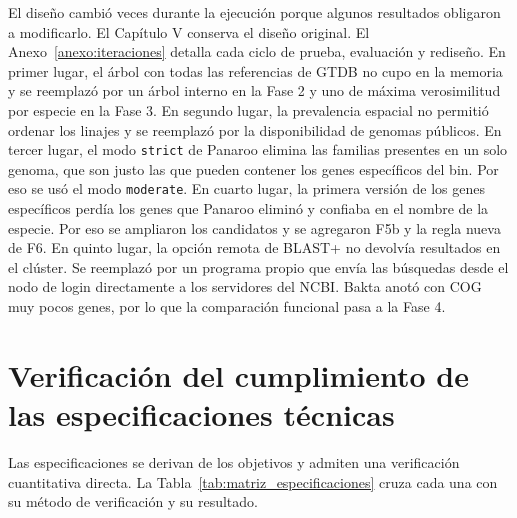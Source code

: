 El diseño cambió  veces durante la ejecución porque algunos resultados
obligaron a modificarlo. El Capítulo V conserva el diseño original. El
Anexo~\ref{anexo:iteraciones} detalla cada ciclo de prueba, evaluación y
rediseño. En primer lugar, el árbol con todas las referencias de GTDB no cupo en
la memoria y se reemplazó por un árbol interno en la Fase 2 y uno de máxima
verosimilitud por especie en la Fase 3. En segundo lugar, la prevalencia
espacial no permitió ordenar los linajes y se reemplazó por la disponibilidad de
genomas públicos. En tercer lugar, el modo \texttt{strict} de Panaroo elimina las familias
presentes en un solo genoma, que son justo las que pueden contener los genes
específicos del bin. Por eso se usó el modo \texttt{moderate}. En cuarto lugar, la
primera versión de los genes específicos perdía los genes que Panaroo eliminó y
confiaba en el nombre de la especie. Por eso se ampliaron los candidatos y se
agregaron F5b y la regla nueva de F6. En quinto lugar, la opción remota de BLAST+ no devolvía resultados en el
clúster. Se reemplazó por un programa propio que envía las búsquedas desde el
nodo de login directamente a los servidores del NCBI.  Bakta
anotó con COG muy pocos genes, por lo que la comparación funcional pasa a la
Fase 4. 


\section{Verificación del cumplimiento de las especificaciones técnicas}

Las especificaciones se derivan de los objetivos  y admiten una
verificación cuantitativa directa. La Tabla~\ref{tab:matriz_especificaciones}
cruza cada una con su método de verificación y su resultado.

